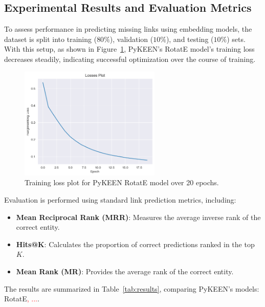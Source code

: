 \subsection*{Experimental Results and Evaluation Metrics}

To assess performance in predicting missing links using embedding models, the dataset is split into training ($80\%$), validation ($10\%$), and testing ($10\%$) sets. With this setup, as shown in Figure~\ref{fig:loss_plot}, PyKEEN's RotatE model's training loss decreases steadily, indicating successful optimization over the course of training.

\begin{figure}[ht]
    \centering
    \includegraphics[width=0.6\textwidth]{images/pykeen/losses.png}
    \caption{Training loss plot for PyKEEN RotatE model over 20 epochs.}
    \label{fig:loss_plot}
\end{figure}

Evaluation is performed using standard link prediction metrics, including:

\begin{itemize}
    \item \textbf{Mean Reciprocal Rank (MRR)}: Measures the average inverse rank of the correct entity. %
    \item \textbf{Hits@K}: Calculates the proportion of correct predictions ranked in the top $K$. %
    \item \textbf{Mean Rank (MR)}: Provides the average rank of the correct entity. %
\end{itemize}

The results are summarized in Table~\ref{tab:results}, comparing PyKEEN's models: RotatE\textcolor{red}{, ...}.

